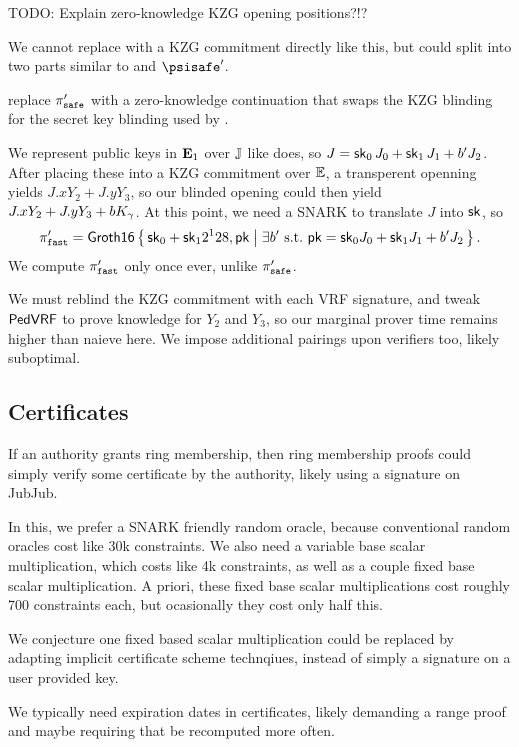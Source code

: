 TODO: Explain zero-knowledge KZG opening positions?!?

We cannot replace \pifast with a KZG commitment directly like this,
but could split \pifast into two parts similar to \pisafe and $\psisafe'$.

replace $\pi_{\mathtt{safe}}'$ with a zero-knowledge continuation
that swaps the KZG blinding for the secret key blinding used by \pifast.

We represent public keys in ${\mathbf{E}}_1$ over ${\mathbb{J}}$ like \pifast does,
so $J = \mathsf{sk}_0\, J_0 + \mathsf{sk}_1\, J_1 + b' J_2$.
After placing these into a KZG commitment over ${\mathbb{E}}$, a transperent
openning yields $J.x Y_2 + J.y Y_3$, so our blinded opening could
then yield $J.x Y_2 + J.y Y_3 + b K_\gamma$.
At this point, we need a SNARK to translate $J$ into $\mathsf{sk}$, so
$$ \pifast' = \rrSNARK \Setst{ \sk_0 + \sk_1 2^128, \pk }{ 
 \exists b' \textrm{\ s.t.\ }
 \pk = \sk_0 \genJ_0 + \sk_1 \genJ_1 + b' \genJ_2
} \mathperiod $$
We compute $\pi_{\mathtt{fast}}'$ only once ever, unlike $\pi_{\mathtt{safe}}'$.

We must reblind the KZG commitment with each VRF signature, and
tweak ${\mathsf{PedVRF}}$ to prove knowledge for $Y_2$ and $Y_3$, so 
our marginal prover time remains higher than naieve \pifast here.
We impose additional pairings upon verifiers too, likely suboptimal.


\subsection{Certificates} %

If an authority grants ring membership, then ring membership proofs
could simply verify some certificate by the authority, likely using
a signature on JubJub.

In this, we prefer a SNARK friendly random oracle,
because conventional random oracles cost like 30k constraints.
We also need a variable base scalar multiplication, which costs like
4k constraints, as well as a couple fixed base scalar multiplication.
A priori, these fixed base scalar multiplications cost roughly 700
constraints each, but ocasionally they cost only half this.   

We conjecture one fixed based scalar multiplication could be replaced
by adapting implicit certificate scheme technqiues,
 instead of simply a signature on a user provided key.

We typically need expiration dates in certificates, likely demanding
a range proof and maybe requiring that \pifast be recomputed more often.

